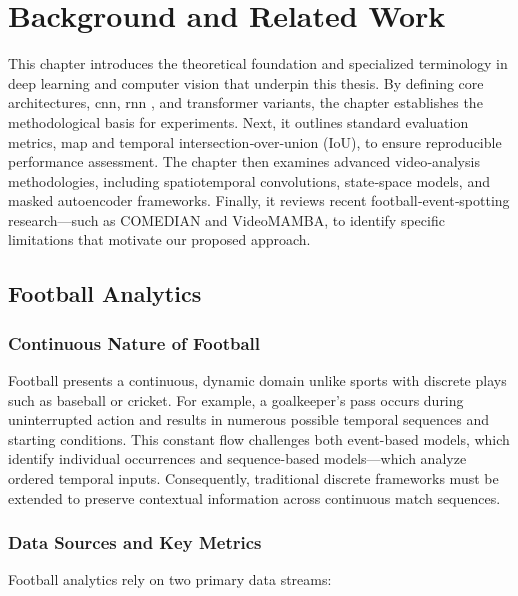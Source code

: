 \chapter{Background and Related Work}
\label{chap:background}

This chapter introduces the theoretical foundation and specialized terminology in deep learning and computer vision that underpin this thesis. By defining core architectures, \acrlong{cnn}, \acrlong{rnn} , and transformer variants, the chapter establishes the methodological basis for experiments. Next, it outlines standard evaluation metrics, \acrfull{map} and temporal intersection‑over‑union (IoU), to ensure reproducible performance assessment. The chapter then examines advanced video‑analysis methodologies, including spatiotemporal convolutions, state‑space models, and masked autoencoder frameworks. Finally, it reviews recent football‑event‑spotting research—such as COMEDIAN and VideoMAMBA, to identify specific limitations that motivate our proposed approach. %

\section{Football Analytics}
\label{sec:football_analytics}

\subsection{Continuous Nature of Football}
Football presents a continuous, dynamic domain unlike sports with discrete plays such as baseball or cricket. For example, a goalkeeper’s pass occurs during uninterrupted action and results in numerous possible temporal sequences and starting conditions. This constant flow challenges both event-based models, which identify individual occurrences and sequence-based models—which analyze ordered temporal inputs. Consequently, traditional discrete frameworks must be extended to preserve contextual information across continuous match sequences. %

\subsection{Data Sources and Key Metrics}
Football analytics rely on two primary data streams:

